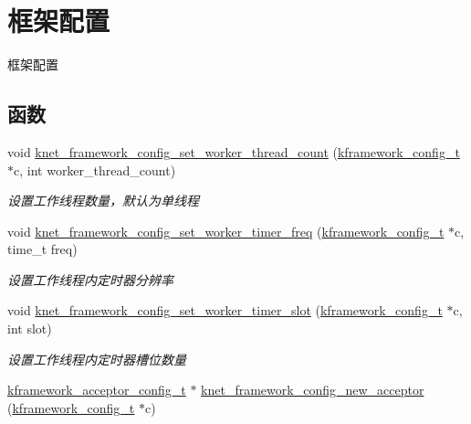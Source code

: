 \hypertarget{a00104}{}\section{框架配置}
\label{a00104}


框架配置  


\subsection*{函数}
\begin{DoxyCompactItemize}
\item 
void \hyperlink{a00104_ga470f4acf8c70060852d435753375fa3b_ga470f4acf8c70060852d435753375fa3b}{knet\+\_\+framework\+\_\+config\+\_\+set\+\_\+worker\+\_\+thread\+\_\+count} (\hyperlink{a00051_adeaf952e0f0887507ff836385bf54874_adeaf952e0f0887507ff836385bf54874}{kframework\+\_\+config\+\_\+t} $\ast$c, int worker\+\_\+thread\+\_\+count)
\begin{DoxyCompactList}\small\item\em 设置工作线程数量，默认为单线程 \end{DoxyCompactList}\item 
void \hyperlink{a00104_ga42497b09d9d0c4039a062ff750ead0a9_ga42497b09d9d0c4039a062ff750ead0a9}{knet\+\_\+framework\+\_\+config\+\_\+set\+\_\+worker\+\_\+timer\+\_\+freq} (\hyperlink{a00051_adeaf952e0f0887507ff836385bf54874_adeaf952e0f0887507ff836385bf54874}{kframework\+\_\+config\+\_\+t} $\ast$c, time\+\_\+t freq)
\begin{DoxyCompactList}\small\item\em 设置工作线程内定时器分辨率 \end{DoxyCompactList}\item 
void \hyperlink{a00104_gae0c5bc540a44a88d64390845744f736f_gae0c5bc540a44a88d64390845744f736f}{knet\+\_\+framework\+\_\+config\+\_\+set\+\_\+worker\+\_\+timer\+\_\+slot} (\hyperlink{a00051_adeaf952e0f0887507ff836385bf54874_adeaf952e0f0887507ff836385bf54874}{kframework\+\_\+config\+\_\+t} $\ast$c, int slot)
\begin{DoxyCompactList}\small\item\em 设置工作线程内定时器槽位数量 \end{DoxyCompactList}\item 
\hyperlink{a00051_a39c993eb450173e4fde04498d757f9b6_a39c993eb450173e4fde04498d757f9b6}{kframework\+\_\+acceptor\+\_\+config\+\_\+t} $\ast$ \hyperlink{a00104_ga681a7f8e071507cc60f8f56043fe4443_ga681a7f8e071507cc60f8f56043fe4443}{knet\+\_\+framework\+\_\+config\+\_\+new\+\_\+acceptor} (\hyperlink{a00051_adeaf952e0f0887507ff836385bf54874_adeaf952e0f0887507ff836385bf54874}{kframework\+\_\+config\+\_\+t} $\ast$c)

\end{DoxyCompactItemize}
